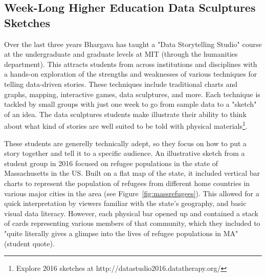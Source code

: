 \documentclass{sigchi-ext}
\begin{document}
\subsection{Week-Long Higher Education Data Sculptures Sketches}

Over the last three years Bhargava has taught a "Data Storytelling Studio" course at the undergraduate and graduate levels at MIT (through the humanities department).  This attracts students from across institutions and disciplines with a hands-on exploration of the strengths and weaknesses of various techniques for telling data-driven stories.  These techniques include traditional charts and graphs, mapping, interactive games, data sculptures, and more.  Each technique is tackled by small groups with just one week to go from sample data to a "sketch" of an idea.  The data sculptures students make illustrate their ability to think about what kind of stories are well suited to be told with physical materials\footnote{Explore 2016 sketches at http://datastudio2016.datatherapy.org/}.

These students are generelly technically adept, so they focus on how to put a story together and tell it to a specific audience. An illustrative sketch from a student group in 2016 focused on refugee populations in the state of Massachusetts in the US.  Built on a flat map of the state, it included vertical bar charts to represent the population of refugees from different home countries in various major cities in the area (see Figure~\ref{fig:massrefugees}).  This allowed for a quick interpretation by viewers familiar with the state's geography, and basic visual data literacy.  However, each physical bar opened up and contained a stack of cards representing various members of that community, which they included to "quite literally gives a glimpse into the lives of refugee populations in MA" (student quote).
\end{document}
